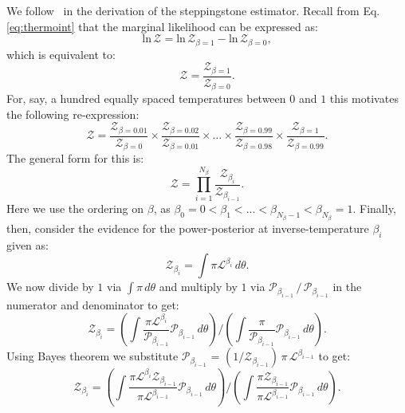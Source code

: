 We follow~\cite{annis2019thermodynamic} in the derivation of the steppingstone estimator. Recall from Eq. \ref{eq:thermoint} that the marginal likelihood can be expressed as:
\begin{equation}
    \mathrm{ln} \, \mathcal{Z} = \mathrm{ln} \, \mathcal{Z}_{\beta=1} - \mathrm{ln} \, \mathcal{Z}_{\beta=0},
\end{equation}
which is equivalent to:
\begin{equation}
    \mathcal{Z} = \frac{\mathcal{Z}_{\beta=1}}{\mathcal{Z}_{\beta=0}}.
\end{equation}
For, say, a hundred equally spaced temperatures between $0$ and $1$ this motivates the following re-expression:
\begin{equation}
    \mathcal{Z} = \frac{\mathcal{Z}_{\beta = 0.01}} {\mathcal{Z}_{\beta = 0}}  
    \times \frac{\mathcal{Z}_{\beta = 0.02}} {\mathcal{Z}_{\beta = 0.01}}
    \times \ldots \times \frac{\mathcal{Z}_{\beta = 0.99}} {\mathcal{Z}_{\beta = 0.98}} \times \frac{\mathcal{Z}_{\beta = 1}} {\mathcal{Z}_{\beta = 0.99}}.
\end{equation}
The general form for this is:
\begin{equation}\label{eqn:ssa_prod_series}
     \mathcal{Z} = \prod_{i=1}^{N_\beta} \frac{\mathcal{Z}_{\beta_{i}}}{\mathcal{Z}_{\beta_{i-1}}}.
\end{equation}
Here we use the ordering on $\beta$, as $\beta_0=0 < \beta_1 < ... < \beta_{N_\beta -1} < \beta_{N_\beta} = 1$. Finally, then, consider the evidence for the  power-posterior at inverse-temperature $\beta_i$ given as:
\begin{equation}
    \mathcal{Z}_{\beta_i} = \int \pi \mathcal{L}^{\beta_i} \, d\theta.
\end{equation}
We now divide by $1$ via $\int \pi \, d\theta$ and multiply by $1$ via $\mathcal{P}_{\beta_{i-1}} \, / \, \mathcal{P}_{\beta_{i-1}}$ in the numerator and denominator to get:
\begin{equation}
    \mathcal{Z}_{\beta_i} = \left(\int \frac{\pi \mathcal{L}^{\beta_i}}{\mathcal{P}_{\beta_{i-1}}} \mathcal{P}_{\beta_{i-1}} \, d\theta \right )\bigg / \left( \int \frac{\pi}{\mathcal{P}_{\beta_{i-1}}} \mathcal{P}_{\beta_{i-1}} \, d\theta \right).
\end{equation}
Using Bayes theorem we substitute $\mathcal{P}_{\beta_{i-1}}$ = $(1/\mathcal{Z}_{\beta_{i-1}}) \, \pi \, \mathcal{L}^{\beta_{i-1}}$ to get:
\begin{equation}
    \mathcal{Z}_{\beta_i} = \left (\int \frac{\pi \mathcal{L}^{\beta_i} \mathcal{Z}_{\beta_{i-1}}}{\pi \mathcal{L}^{\beta_{i-1}}} \mathcal{P}_{\beta_{i-1}} \, d\theta \right) \bigg / \left(\int \frac{\pi \mathcal{Z}_{\beta_{i-1}}}{\pi \mathcal{L}^{\beta_{i-1}}} \mathcal{P}_{\beta_{i-1}} \, d\theta\right).
\end{equation}
